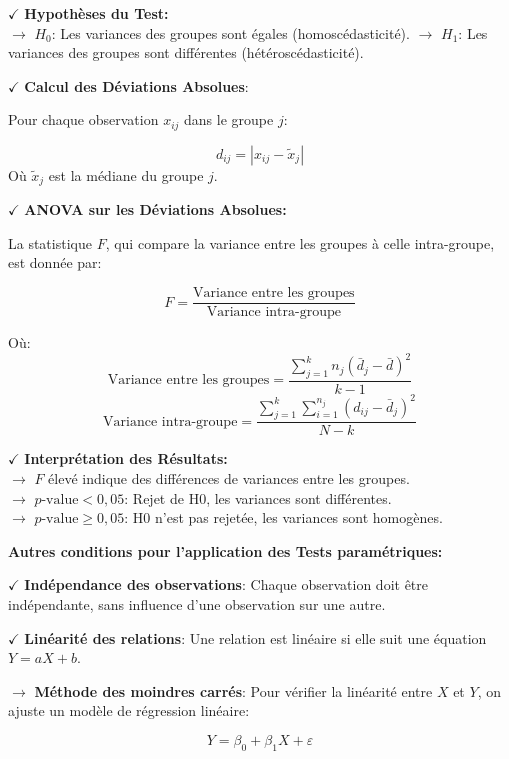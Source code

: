 \textbf{\(\checkmark\)} \textbf{Hypothèses du Test:}\\
\noindent \textbf{\(\rightarrow\)} \( H_0 \): Les variances des groupes sont égales (homoscédasticité).
\textbf{\(\rightarrow\)} \( H_1 \): Les variances des groupes sont différentes (hétéroscédasticité).

\textbf{\(\checkmark\)} \textbf{Calcul des Déviations Absolues}:

Pour chaque observation \( x_{ij} \) dans le groupe \( j \):

\[
d_{ij} = \left| x_{ij} - \tilde{x}_j \right|
\]
Où \( \tilde{x}_j \) est la médiane du groupe \( j \).

\textbf{\(\checkmark\)} \textbf{ANOVA sur les Déviations Absolues:}

La statistique \( F \), qui compare la variance entre les groupes à celle intra-groupe, est donnée par:

\[
F = \frac{\text{Variance entre les groupes}}{\text{Variance intra-groupe}}
\]

Où:
\[
\text{Variance entre les groupes} = \frac{\sum_{j=1}^{k} n_j \left( \bar{d}_j - \bar{d} \right)^2}{k - 1}
\]
\[
\text{Variance intra-groupe} = \frac{\sum_{j=1}^{k} \sum_{i=1}^{n_j} \left( d_{ij} - \bar{d}_j \right)^2}{N - k}
\]

\textbf{\(\checkmark\)} \textbf{Interprétation des Résultats:}\\
\noindent \textbf{\(\rightarrow\)} \( F \) élevé indique des différences de variances entre les groupes.\\
\textbf{\(\rightarrow\)} \( p\text{-value} < 0{,}05 \): Rejet de H0, les variances sont différentes.\\
\textbf{\(\rightarrow\)} \( p\text{-value} \geq 0{,}05 \): H0 n'est pas rejetée, les variances sont homogènes.

\textbf{Autres conditions pour l’application des Tests paramétriques:}

\textbf{\(\checkmark\)} \textbf{Indépendance des observations}: Chaque observation doit être indépendante, sans influence d'une observation sur une autre.

\textbf{\(\checkmark\)} \textbf{Linéarité des relations}: Une relation est linéaire si elle suit une équation \( Y = aX + b \).

\noindent \textbf{\(\rightarrow\)} \textbf{Méthode des moindres carrés}: Pour vérifier la linéarité entre \( X \) et \( Y \), on ajuste un modèle de régression linéaire:

\[
Y = \beta_0 + \beta_1 X + \varepsilon
\]

